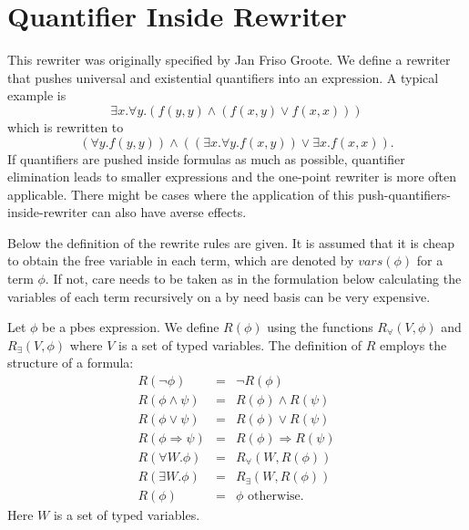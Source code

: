 \documentclass{article}
\newcommand{\vars}{\mathit{vars}}
\begin{document}
\newpage
\section{Quantifier Inside Rewriter}

This rewriter was originally specified by Jan Friso Groote.
We define a rewriter that pushes universal and existential quantifiers into an
expression. A typical example is
\[ \exists x.\forall y.(f(y,y)\wedge (f(x,y)\vee f(x,x))) \]
which is rewritten to
\[(\forall y.f(y,y)) \wedge ((\exists x.\forall y.f(x,y)) \vee \exists x.f(x,x)).\]
If quantifiers are pushed inside formulas as much as possible, quantifier elimination leads to smaller
expressions and the one-point rewriter is more often applicable. There might be cases where the
application of this push-quantifiers-inside-rewriter can also have averse effects.

Below the definition of the rewrite rules are given. It is assumed that it is cheap to obtain the
free variable in each term, which are denoted by $\vars(\phi)$ for a term $\phi$.
If not, care needs to be taken as in the formulation below calculating the
variables of each term recursively on a by need basis can be very expensive.

Let $\phi$ be a pbes expression. We
define $R(\phi)$ using the functions $R_{\forall}(V,\phi)$ and
$R_{\exists}(V,\phi)$ where $V$ is a set of typed variables. The
definition of $R$ employs the structure of a formula:
\begin{equation*}
\begin{array}{lll}
R(\neg \phi)&=&\neg R(\phi)\\
R(\phi\wedge \psi)&=&R(\phi)\wedge R(\psi)\\
R(\phi\vee\psi)&=&R(\phi)\vee R(\psi)\\
R(\phi\Rightarrow\psi)&=&R(\phi)\Rightarrow R(\psi)\\
R(\forall W.\phi)&=&R_{\forall}(W,R(\phi))\\
R(\exists W.\phi)&=&R_{\exists}(W,R(\phi))\\
R(\phi)&=&\phi\textrm{  otherwise}.
\end{array}
\end{equation*}
Here $W$ is a set of typed variables.
\end{document}
